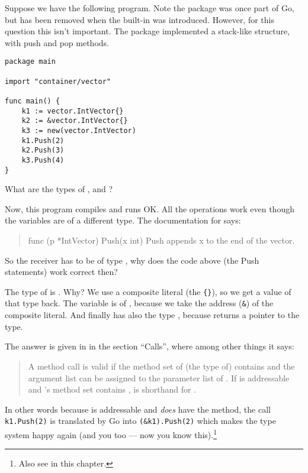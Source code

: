 \begin{Exercise}[title={Method calls},difficulty=2]
\label{ex:methodcalls}
\Question \label{ex:methodcalls q1} Suppose we have the following
program. Note the package  was once part
of Go, but has been removed when the  built-in was introduced.
However, for this question this isn't important. The package implemented
a stack-like structure, with push and pop methods.
\begin{lstlisting}
package main

import "container/vector"

func main() {
	k1 := vector.IntVector{}
	k2 := &vector.IntVector{}
	k3 := new(vector.IntVector)
	k1.Push(2)
	k2.Push(3)
	k3.Push(4)
}
\end{lstlisting}
What are the types of ,  and ?

\Question Now, this program compiles and runs OK. All the 
operations work even though the variables are of a different type. The
documentation for  says:
\begin{quote}
func (p *IntVector) Push(x int)
Push appends x to the end of the vector.
\end{quote}
So the receiver has to be of type , why does the code
above (the Push statements) work correct then?

\end{Exercise}

\begin{Answer}
\Question The type of  is . Why? We use 
a composite literal (the \verb|{}|), so we get a value of that type
back. The variable  is of , because we
take the address (\verb|&|) of the composite literal. And finally
 has also the type , because 
returns a pointer to the type.

\Question The answer is given in \cite{go_spec} in the section ``Calls'',
where among other things it says:
\begin{quote}
A method call  is valid if the method set of (the type of)
contains  and the argument list can be assigned to the parameter list
of . If  is addressable and 's method set
contains ,  is shorthand for .
\end{quote}
In other words because  is addressable and
 \emph{does} have the  method, the
call \lstinline{k1.Push(2)} is translated by Go into 
\lstinline{(&k1).Push(2)} which makes the type system happy again (and
you too --- now you know this).\footnote{Also see  in this chapter.}

\end{Answer}
